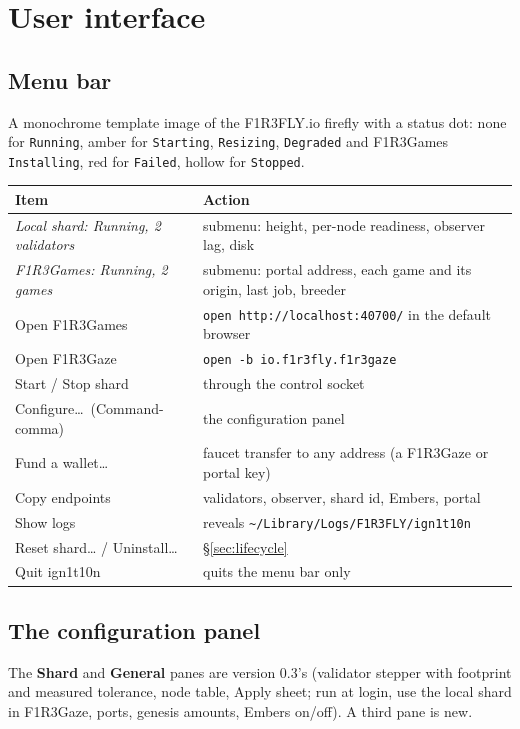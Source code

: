 \documentclass[11pt]{article}
\theoremstyle{definition}
\theoremstyle{remark}
\newcommand{\code}[1]{\texttt{#1}}
\newcommand{\Gz}{F1R3Gaze}
\newcommand{\Gm}{F1R3Games}
\newcommand{\Em}{Embers}
\begin{document}
\section{User interface}\label{sec:ui}

\subsection{Menu bar}
A monochrome template image of the F1R3FLY.io firefly with a status dot: none for
\code{Running}, amber for \code{Starting}, \code{Resizing}, \code{Degraded} and
\Gm{} \code{Installing}, red for \code{Failed}, hollow for \code{Stopped}.

\begin{center}\small
\begin{tabularx}{\linewidth}{@{}p{5.0cm}X@{}}
\toprule
Item & Action\\
\midrule
\textit{Local shard: Running, 2 validators} & submenu: height, per-node readiness, observer lag, disk\\
\textit{F1R3Games: Running, 2 games} & submenu: portal address, each game and its origin, last job, breeder\\
Open F1R3Games & \code{open http://localhost:40700/} in the default browser\\
Open F1R3Gaze & \code{open -b io.f1r3fly.f1r3gaze}\\
Start / Stop shard & through the control socket\\
Configure\ldots\ (Command-comma) & the configuration panel\\
Fund a wallet\ldots & faucet transfer to any address (a \Gz{} or portal key)\\
Copy endpoints & validators, observer, shard id, \Em{}, portal\\
Show logs & reveals \code{\textasciitilde/Library/Logs/F1R3FLY/ign1t10n}\\
Reset shard\ldots{} / Uninstall\ldots & \S\ref{sec:lifecycle}\\
Quit ign1t10n & quits the menu bar only\\
\bottomrule
\end{tabularx}
\end{center}

\subsection{The configuration panel}\label{sec:panel}

The \textbf{Shard} and \textbf{General} panes are version 0.3's (validator stepper
with footprint and measured tolerance, node table, Apply sheet; run at login, use the
local shard in \Gz{}, ports, genesis amounts, \Em{} on/off). A third pane is new.
\end{document}
